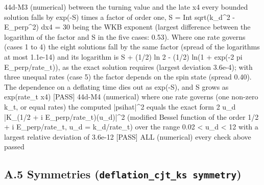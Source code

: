 \documentclass[
  10pt,
]{article}
\newenvironment{Shaded}{}{}
\newcommand{\NormalTok}[1]{#1}
\begin{document}
\begin{Shaded}
\begin{Highlighting}[]
\NormalTok{[PASS] 44d{-}M3  (numerical) between the turning value and the late x4 every bounded solution falls by exp({-}S) times a factor of order one, S = Int sqrt(k\_d\^{}2 {-} E\_perp\^{}2) dx4 = 30 being the WKB exponent (largest difference between the logarithm of the factor and S in the five cases: 0.53). Where one rate governs (cases 1 to 4) the eight solutions fall by the same factor (spread of the logarithms at most 1.1e{-}14) and its logarithm is S + (1/2) ln 2 {-} (1/2) ln(1 + exp({-}2 pi E\_perp/rate\_t)), as the exact solution requires (largest deviation 3.6e{-}4); with three unequal rates (case 5) the factor depends on the spin state (spread 0.40). The dependence on a deflating time dies out as exp({-}S), and S grows as exp(rate\_t x4)}
\NormalTok{[PASS] 44d{-}M4  (numerical) where one rate governs (one non{-}zero k\_t, or equal rates) the computed |psihat|\^{}2 equals the exact form 2 u\_d |K\_(1/2 + i E\_perp/rate\_t)(u\_d)|\^{}2 (modified Bessel function of the order 1/2 + i E\_perp/rate\_t, u\_d = k\_d/rate\_t) over the range 0.02 \textless{} u\_d \textless{} 12 with a largest relative deviation of 3.6e{-}12}
\NormalTok{[PASS] ALL  (numerical) every check above passed}
\end{Highlighting}
\end{Shaded}

\hypertarget{a.5-symmetries-deflation_cjt_ks-symmetry}{%
\subsection{\texorpdfstring{A.5 Symmetries
(\texttt{deflation\_cjt\_ks\ symmetry})}{A.5 Symmetries (deflation\_cjt\_ks symmetry)}}\label{a.5-symmetries-deflation_cjt_ks-symmetry}}
\end{document}
